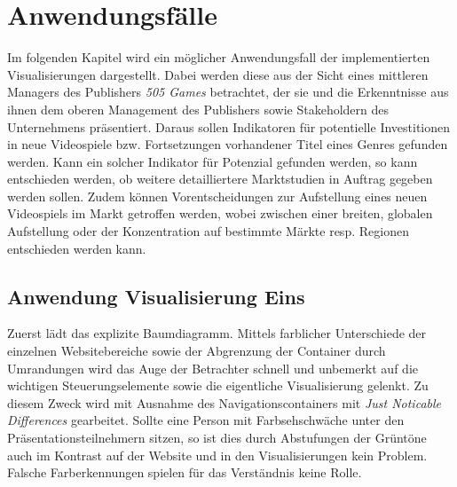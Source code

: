 \documentclass[usegeometry=true]{scrartcl}
\begin{document}
\section{Anwendungsfälle}
Im folgenden Kapitel wird ein möglicher Anwendungsfall der implementierten Visualisierungen dargestellt.
Dabei werden diese aus der Sicht eines mittleren Managers des Publishers \textit{505 Games} betrachtet, der sie und die Erkenntnisse aus ihnen dem oberen Management des Publishers sowie Stakeholdern des Unternehmens präsentiert. 
Daraus sollen Indikatoren für potentielle Investitionen in neue Videospiele bzw. Fortsetzungen vorhandener Titel eines Genres gefunden werden. 
Kann ein solcher Indikator für Potenzial gefunden werden, so kann entschieden werden, ob weitere detailliertere Marktstudien in Auftrag gegeben werden sollen. 
Zudem können Vorentscheidungen zur Aufstellung eines neuen Videospiels im Markt getroffen werden, wobei zwischen einer breiten, globalen Aufstellung oder der Konzentration auf bestimmte Märkte resp. Regionen entschieden werden kann.

\subsection{Anwendung Visualisierung Eins}
Zuerst lädt das explizite Baumdiagramm. 
Mittels farblicher Unterschiede der einzelnen Websitebereiche sowie der Abgrenzung der Container durch Umrandungen wird das Auge der Betrachter schnell und unbemerkt auf die wichtigen Steuerungselemente sowie die eigentliche Visualisierung gelenkt.
Zu diesem Zweck wird mit Ausnahme des Navigationscontainers mit \textit{Just Noticable Differences} gearbeitet.
Sollte eine Person mit Farbsehschwäche unter den Präsentationsteilnehmern sitzen, so ist dies durch Abstufungen der Grüntöne auch im Kontrast auf der Website und in den Visualisierungen kein Problem. 
Falsche Farberkennungen spielen für das Verständnis keine Rolle.
\end{document}
